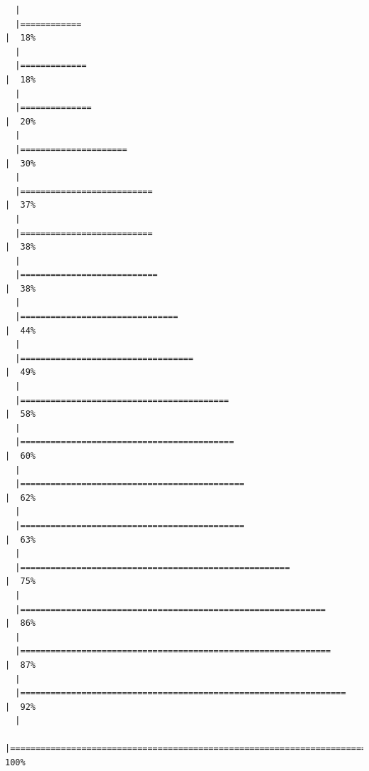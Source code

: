 \documentclass[
  letterpaper,
  DIV=11,
  numbers=noendperiod]{scrreprt}
\begin{document}
\begin{verbatim}
  |                                                                            
  |============                                                          |  18%
  |                                                                            
  |=============                                                         |  18%
  |                                                                            
  |==============                                                        |  20%
  |                                                                            
  |=====================                                                 |  30%
  |                                                                            
  |==========================                                            |  37%
  |                                                                            
  |==========================                                            |  38%
  |                                                                            
  |===========================                                           |  38%
  |                                                                            
  |===============================                                       |  44%
  |                                                                            
  |==================================                                    |  49%
  |                                                                            
  |=========================================                             |  58%
  |                                                                            
  |==========================================                            |  60%
  |                                                                            
  |============================================                          |  62%
  |                                                                            
  |============================================                          |  63%
  |                                                                            
  |=====================================================                 |  75%
  |                                                                            
  |============================================================          |  86%
  |                                                                            
  |=============================================================         |  87%
  |                                                                            
  |================================================================      |  92%
  |                                                                            
  |======================================================================| 100%
\end{verbatim}
\end{document}
